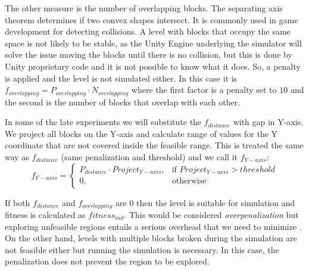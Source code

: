 \documentclass[sigconf]{acmart}
\begin{document}


The other measure is the number of overlapping blocks. The separating axis 
theorem \cite{ericson2004real} determines if two convex shapes intersect. It is 
commonly used in game development for detecting collisions. A level with blocks 
that occupy the same space is not likely to be stable, as the Unity
Engine underlying the simulator will solve the issue moving the blocks until there is no collision, but this is done by Unity proprietary code and it is not possible to know what it does.
So, a penalty is applied and the level is not simulated either. 
In this case it is $f_{overlapping} = P_{overlapping} \cdot N_{overlapping}$ 
where the first factor is a penalty set to $10$ and the second is the number of 
blocks that overlap with each other.

In some of the late experiments we will substitute the $f_{distance}$ with gap in Y-axis.
We project all blocks on the Y-axis and calculate range of values for the Y coordinate
that are not covered inside the feasible range. This is treated the same way as $f_{distance}$
(same penalization and threshold) and we call it $f_{Y-axis}$:
$$f_{Y-axis} = 
\begin{cases}
P_{distance}\cdot Project_{Y-axis}, & \text{if } Project_{Y-axis} > threshold\\
0, & \text{otherwise}
\end{cases}
$$

If both $f_{distance}$ and $f_{overlapping}$ are $0$ then the level is suitable 
for simulation and fitness is calculated as $fitness_{ind}$. This would be 
considered \textit{overpenalization} but exploring unfeasible regions entails a 
serious overhead that we need to minimize \cite{runarsson2003evolutionary}. 
On the other hand, levels with 
multiple blocks broken during the simulation are not feasible either but 
running the simulation is necessary. In this case, the penalization does not 
prevent the region to be explored.
\end{document}
